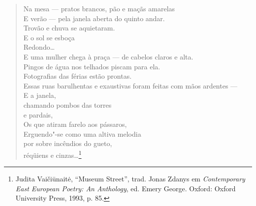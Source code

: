 \begin{verse}
Na mesa --- pratos brancos, pão e maçãs amarelas\\
E verão --- pela janela aberta do quinto andar.\\
Trovão e chuva se aquietaram.\\
\quad E o sol se esboça\\
Redondo\ldots{}\\
E uma mulher chega à praça --- de cabelos claros e \qb{}alta.\\
Pingos de água nos telhados piscam para ela.\\
Fotografias das férias estão prontas.\\
Essas ruas barulhentas e exaustivas foram feitas \qb{}com mãos ardentes ---\\
E a janela,\\
\quad chamando pombos das torres\\
\quad \quad e pardais,\\
Os que atiram farelo aos pássaros,\\
Erguendo"-se como uma altiva melodia\\
\quad por sobre incêndios do gueto,\\
\quad \quad réqüiens e cinzas\ldots{}\footnote{Judita Vaičiūnaitė, ``Museum
  Street'', trad. Jonas Zdanys em \emph{Contemporary East European
  Poetry: An Anthology}, ed. Emery George. Oxford: Oxford University
  Press, 1993, p. 85.}
\end{verse}

